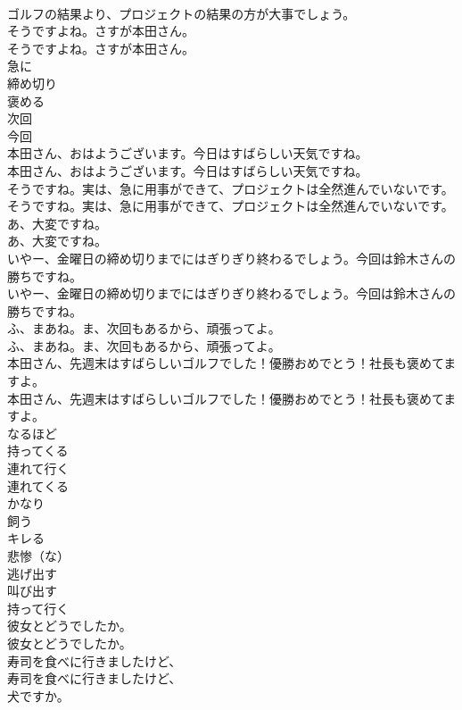 \documentclass[8pt]{extreport}
\begin{document}
\begin{CJK}{UTF8}{min}
\\	ゴルフの結果より、プロジェクトの結果の方が大事でしょう。 
\\	そうですよね。さすが本田さん。	
\\	そうですよね。さすが本田さん。 
\\	急に
\\	締め切り
\\	褒める
\\	次回
\\	今回
\\	本田さん、おはようございます。今日はすばらしい天気ですね。	
\\	本田さん、おはようございます。今日はすばらしい天気ですね。 
\\	そうですね。実は、急に用事ができて、プロジェクトは全然進んでいないです。	
\\	そうですね。実は、急に用事ができて、プロジェクトは全然進んでいないです。 
\\	あ、大変ですね。	
\\	あ、大変ですね。 
\\	いやー、金曜日の締め切りまでにはぎりぎり終わるでしょう。今回は鈴木さんの勝ちですね。	
\\	いやー、金曜日の締め切りまでにはぎりぎり終わるでしょう。今回は鈴木さんの勝ちですね。 
\\	ふ、まあね。ま、次回もあるから、頑張ってよ。	
\\	ふ、まあね。ま、次回もあるから、頑張ってよ。 
\\	本田さん、先週末はすばらしいゴルフでした！優勝おめでとう！社長も褒めてますよ。	
\\	本田さん、先週末はすばらしいゴルフでした！優勝おめでとう！社長も褒めてますよ。 
\\	なるほど
\\	持ってくる
\\	連れて行く
\\	連れてくる
\\	かなり
\\	飼う
\\	キレる
\\	悲惨（な）
\\	逃げ出す
\\	叫び出す
\\	持って行く
\\	彼女とどうでしたか。	
\\	彼女とどうでしたか。 
\\	寿司を食べに行きましたけど、	
\\	寿司を食べに行きましたけど、 
\\	犬ですか。	

\end{CJK}
\end{document}
